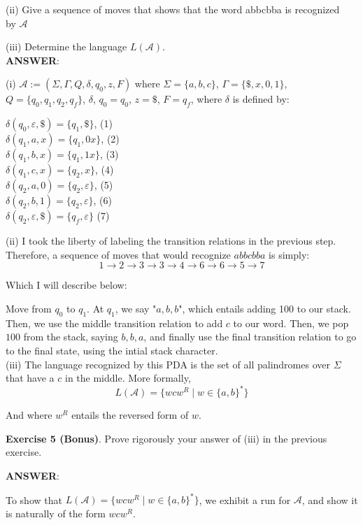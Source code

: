 \documentclass{article}
\begin{document}
(ii) Give a sequence of moves that shows that the word abbcbba is recognized\\
by $\mathcal{A}$

(iii) Determine the language $L(\mathcal{A})$.\\

\textbf{ANSWER}:

(i)
$\mathcal{A} := (\Sigma, \Gamma, Q, \delta, q_0, z, F)$ where $\Sigma = \{a, b, c\}$, $\Gamma = \{\$, x, 0, 1\}$, $Q = \{q_0, q_1, q_2, q_f\}$, $\delta$, $q_0 = q_0$, $z = \$$, $F = q_f$, where $\delta$ is defined by:
\begin{center}
$\delta(q_0, \varepsilon, \$) = \{q_1, \$\}$, (1)\\
$\delta(q_1, a, x) = \{q_1, 0x\}$, (2) \\
$\delta(q_1, b, x) = \{q_1, 1x\}$, (3)\\ 
$\delta(q_1, c, x )= \{q_2, x\}$, (4)\\ 
$\delta(q_2, a, 0) = \{q_2, \varepsilon\}$, (5)\\  
$\delta(q_2, b, 1) = \{q_2, \varepsilon\}$, (6)\\
$\delta(q_2, \varepsilon, \$) = \{q_f, \varepsilon\}$ (7)
\end{center}
(ii)
I took the liberty of labeling the transition relations in the previous step. Therefore, a sequence of moves that would recognize $abbcbba$ is simply: \[1 \rightarrow 2 \rightarrow 3 \rightarrow 3 \rightarrow 4 \rightarrow 6 \rightarrow 6 \rightarrow 5 \rightarrow 7\]

Which I will describe below:

Move from $q_0$ to $q_1$. At $q_1$, we say "$a, b, b$", which entails adding 100 to our stack. Then, we use the middle transition relation to add $c$ to our word. Then, we pop $100$ from the stack, saying $b, b, a$, and finally use the final transition relation to go to the final state, using the intial stack character.\\

(iii)
The language recognized by this PDA is the set of all palindromes over $\Sigma$ that have a $c$ in the middle. More formally, 
\[L(\mathcal{A}) = \{w c w^R \mid w \in \{a, b\}^*\} \]

And where $w^R$ entails the reversed form of $w$.

\textbf{Exercise 5 (Bonus)}. Prove rigorously your answer of (iii) in the previous exercise.

\textbf{ANSWER}:

To show that $L(\mathcal{A}) = \{w c w^R \mid w \in \{a, b\}^*\}$, we exhibit a run for $\mathcal{A}$, and show it is naturally of the form $wcw^R$. 
\end{document}
